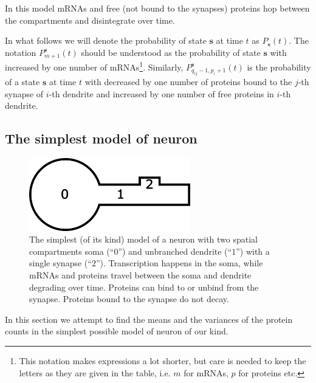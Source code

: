 \documentclass[a4paper, 11pt]{article}
\begin{document}
In this model mRNAs and free (not bound to the synapses) proteins hop between the compartments and disintegrate over time.

In what follows we will denote the probability of state $\mathbf s$ at time $t$ as $P_{\mathbf s}(t)$. The notation $P^{\mathbf s}_{m+1}(t)$ should be understood as the probability of state $\mathbf s$ with increased by one number of mRNAs\footnote{This notation makes expressions a lot shorter, but care is needed to keep the letters as they are given in the table, i.e. $m$ for mRNAs, $p$ for proteins etc.}. Similarly, $P^{\mathbf s}_{q_{ij}-1, p_i+1}(t)$ is the probability of a state $\mathbf s$ at time $t$ with decreased by one number of proteins bound to the $j$-th synapse of $i$-th dendrite and increased by one number of free proteins in $i$-th dendrite.



\subsection{The simplest model of neuron}
\begin{figure}
  \begin{center}
    \includegraphics[width=7cm]{img/simplest_neuron.png}
  \end{center}  
  \caption{The simplest (of its kind) model of a neuron with two spatial compartments soma (``$0$'') and unbranched dendrite (``$1$'') with a single synapse (``$2$''). Transcription happens in the soma, while mRNAs and proteins travel between the soma and dendrite degrading over time. Proteins can bind to or unbind from the synapse. Proteins bound to the synapse do not decay.}
  \label{50_node_triad_sample}
\end{figure}
In this section we attempt to find the means and the variances of the protein counts in the simplest possible model of neuron of our kind.
\end{document}

